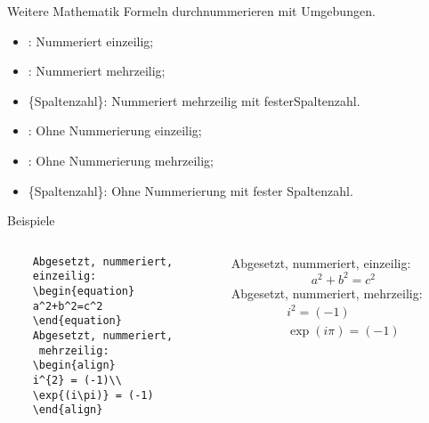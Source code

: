 \begin{frame}[fragile]{Weitere Mathematik}
Formeln durchnummerieren mit Umgebungen. 

\pause
\begin{itemize}
\item {}: Nummeriert einzeilig;\pause
\item {}: Nummeriert mehrzeilig;\pause
\item {}\textrm{\{\textlangle Spaltenzahl\textrangle\}}: Nummeriert mehrzeilig mit festerSpaltenzahl.\pause
\item {}: Ohne Nummerierung einzeilig;
\item {}: Ohne Nummerierung mehrzeilig;
\item {}\textrm{\{\textlangle Spaltenzahl\textrangle\}}: Ohne Nummerierung mit fester Spaltenzahl.
\end{itemize}
\end{frame}

\begin{frame}[fragile]{Beispiele}
\begin{columns}
\begin{column}{.48\textwidth}\footnotesize
\begin{codeblock}
\begin{verbatim}
	Abgesetzt, nummeriert, 
	einzeilig:
    \begin{equation}
    a^2+b^2=c^2
    \end{equation}
    Abgesetzt, nummeriert,
     mehrzeilig:
    \begin{align}
    i^{2} = (-1)\\
    \exp{(i\pi)} = (-1) 
    \end{align}
\end{verbatim}
\end{codeblock}
\end{column}
%
\begin{column}{.45\textwidth}	\pause	
	Abgesetzt, nummeriert, einzeilig:
    \begin{equation}
    a^2+b^2=c^2
    \end{equation}\pause
    Abgesetzt, nummeriert, mehrzeilig:
    \begin{align}
    i^{2} = (-1)\\
    \exp{(i\pi)} = (-1) 
    \end{align}
\end{column}
\end{columns}
\end{frame}